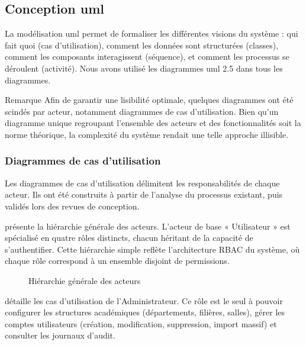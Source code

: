 \subsection{Conception \acrshort{uml}}
\label{ch3:conception_uml}

La modélisation \acrshort{uml} permet de formaliser les différentes visions du système : qui fait quoi (cas d'utilisation), comment les données sont structurées (classes), comment les composants interagissent (séquence), et comment les processus se déroulent (activité). Nous avons utilisé les diagrammes \acrshort{uml} 2.5 dans tous les diagrammes.

\begin{projectbox}{Remarque}
    Afin de garantir une lisibilité optimale, quelques diagrammes ont été scindés par acteur, notamment diagrammes de cas d'utilisation. Bien qu'un diagramme unique regroupant l'ensemble des acteurs et des fonctionnalités soit la norme théorique, la complexité du système rendait une telle approche illisible.
\end{projectbox}

\subsubsection{Diagrammes de cas d'utilisation}
\label{ch3:uc}

Les diagrammes de cas d'utilisation délimitent les responsabilités de chaque acteur. Ils ont été construits à partir de l'analyse du processus existant, puis validés lors des revues de conception.

 présente la hiérarchie générale des acteurs. L'acteur de base « Utilisateur » est spécialisé en quatre rôles distincts, chacun héritant de la capacité de s'authentifier. Cette hiérarchie simple reflète l'architecture RBAC du système, où chaque rôle correspond à un ensemble disjoint de permissions.

\begin{figure}[H]
    \centering
    \caption{Hiérarchie générale des acteurs}
    \label{fig:uc_hierarchy}
\end{figure}

 détaille les cas d'utilisation de l'Administrateur. Ce rôle est le seul à pouvoir configurer les structures académiques (départements, filières, salles), gérer les comptes utilisateurs (création, modification, suppression, import massif) et consulter les journaux d'audit.


